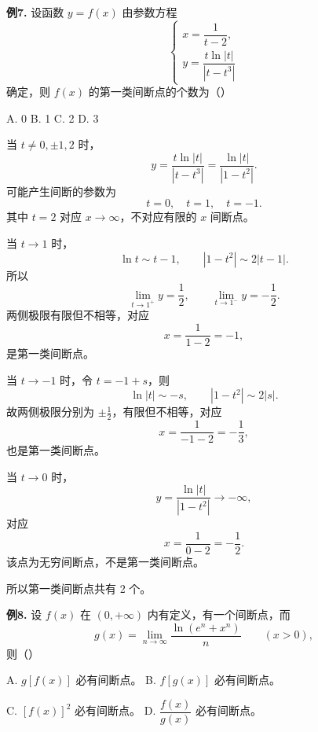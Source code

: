 \begin{problemblock}
\textbf{例7.} 设函数 \(y=f(x)\) 由参数方程
\[
\begin{cases}
x=\dfrac1{t-2},\\[1mm]
y=\dfrac{t\ln|t|}{|t-t^3|}
\end{cases}
\]
确定，则 \(f(x)\) 的第一类间断点的个数为（\quad）

A. 0 \qquad B. 1 \qquad C. 2 \qquad D. 3
\end{problemblock}

\begin{solutionblock}

当 \(t\ne0,\pm1,2\) 时，
\[
y=\frac{t\ln|t|}{|t-t^3|}
=\frac{\ln|t|}{|1-t^2|}.
\]
可能产生间断的参数为
\[
t=0,\quad t=1,\quad t=-1.
\]
其中 \(t=2\) 对应 \(x\to\infty\)，不对应有限的 \(x\) 间断点。

当 \(t\to1\) 时，
\[
\ln t\sim t-1,\qquad |1-t^2|\sim2|t-1|.
\]
所以
\[
\lim_{t\to1^+}y=\frac12,\qquad
\lim_{t\to1^-}y=-\frac12.
\]
两侧极限有限但不相等，对应
\[
x=\frac1{1-2}=-1,
\]
是第一类间断点。

当 \(t\to-1\) 时，令 \(t=-1+s\)，则
\[
\ln|t|\sim -s,\qquad |1-t^2|\sim2|s|.
\]
故两侧极限分别为 \(\pm\frac12\)，有限但不相等，对应
\[
x=\frac1{-1-2}=-\frac13,
\]
也是第一类间断点。

当 \(t\to0\) 时，
\[
y=\frac{\ln|t|}{|1-t^2|}\to-\infty,
\]
对应
\[
x=\frac1{0-2}=-\frac12.
\]
该点为无穷间断点，不是第一类间断点。

所以第一类间断点共有 2 个。

\end{solutionblock}

\begin{problemblock}
\textbf{例8.} 设 \(f(x)\) 在 \((0,+\infty)\) 内有定义，有一个间断点，而
\[
g(x)=\lim_{n\to\infty}\frac{\ln(e^n+x^n)}{n}\qquad(x>0),
\]
则（\quad）

A. \(g[f(x)]\) 必有间断点。\qquad
B. \(f[g(x)]\) 必有间断点。

C. \([f(x)]^2\) 必有间断点。\qquad
D. \(\dfrac{f(x)}{g(x)}\) 必有间断点。
\end{problemblock}

